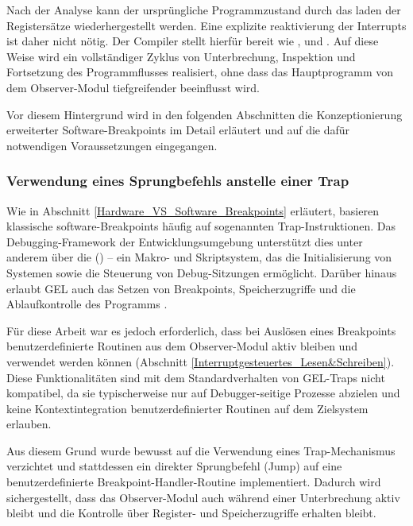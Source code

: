 Nach der Analyse kann der urspr\"ungliche Programmzustand durch das laden der Registers\"atze wiederhergestellt werden. Eine explizite reaktivierung der Interrupts ist daher nicht n\"otig. Der Compiler stellt hierf\"ur  bereit wie ,  und  . Auf diese Weise wird ein vollst\"andiger Zyklus von Unterbrechung, Inspektion und Fortsetzung des Programmflusses realisiert, ohne dass das Hauptprogramm von dem Observer-Modul tiefgreifender beeinflusst wird.

Vor diesem Hintergrund wird in den folgenden Abschnitten die Konzeptionierung erweiterter Software-Breakpoints im Detail erl\"autert und auf die daf\"ur notwendigen Voraussetzungen eingegangen.

\subsubsection{Verwendung eines Sprungbefehls anstelle einer Trap}
\label{sec:JumpVsTrap}

Wie in Abschnitt \ref{Hardware_VS_Software_Breakpoints} erl\"autert, basieren klassische software-Breakpoints h\"aufig auf sogenannten Trap-Instruktionen. Das Debugging-Framework der Entwicklungsumgebung unterst\"utzt dies unter anderem \"uber die  () – ein Makro- und Skriptsystem, das die Initialisierung von Systemen sowie die Steuerung von Debug-Sitzungen erm\"oglicht. Darüber hinaus erlaubt GEL auch das Setzen von Breakpoints, Speicherzugriffe und die Ablaufkontrolle des Programms .

Für diese Arbeit war es jedoch erforderlich, dass bei Ausl\"osen eines Breakpoints benutzerdefinierte Routinen aus dem Observer-Modul aktiv bleiben und verwendet werden k\"onnen (\Vgl Abschnitt \ref{Interruptgesteuertes_Lesen&Schreiben}). Diese Funktionalit\"aten sind mit dem Standardverhalten von GEL-Traps nicht kompatibel, da sie typischerweise nur auf Debugger-seitige Prozesse abzielen und keine Kontextintegration benutzerdefinierter Routinen auf dem Zielsystem erlauben.

Aus diesem Grund wurde bewusst auf die Verwendung eines Trap-Mechanismus verzichtet und stattdessen ein direkter Sprungbefehl (Jump) auf eine benutzerdefinierte Breakpoint-Handler-Routine implementiert. Dadurch wird sichergestellt, dass das Observer-Modul auch w\"ahrend einer Unterbrechung aktiv bleibt und die Kontrolle \"uber Register- und Speicherzugriffe erhalten bleibt.

